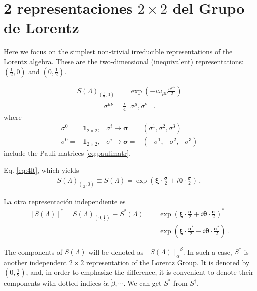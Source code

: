 \section{2 representaciones $2\times 2$ del Grupo de Lorentz}
\begin{frame}
Here we focus on the simplest non-trivial irreducible representations of the Lorentz algebra. These are the two-dimensional (inequivalent) representations: $(\frac{1}{2},0)$ and $(0,\frac{1}{2})$. 

\begin{align}
  S(\Lambda)_{\left( \frac{1}{2},0 \right)}=&\exp\left(-i \omega_{\mu\nu}\frac{\sigma^{\mu\nu}}{2}\right)\nonumber
\end{align}
\begin{align}
  \sigma^{\mu\nu}=\frac{i}{4}\left[\sigma^\mu,\overline{\sigma}^\nu\right]\,.
\end{align}
where
\begin{align}
  \sigma^0=&\mathbf{1}_{2\times2},& \sigma^{i}\to \boldsymbol{\sigma}=&(\sigma^1,\sigma^2,\sigma^3)\nonumber\\
  \overline{\sigma}^0=&\mathbf{1}_{2\times2},& \overline{\sigma}^{i}\to \overline{\boldsymbol{\sigma}}=&(-\sigma^1,-\sigma^2,-\sigma^3)
\end{align}
include the Pauli matrices \eqref{eq:paulimatr}.

\end{frame}
\begin{frame}
Eq. \eqref{eq:4lt}, which yields
\begin{align}
\label{eq:SLet}
  S(\Lambda)_{\left( \frac{1}{2},0 \right)}\equiv S(\Lambda)=
\exp\left( \boldsymbol{\xi}\cdot \frac{\boldsymbol{\sigma}}{2}+i\boldsymbol{\theta}\cdot \frac{\boldsymbol{\sigma}}{2} \right)\,,
\end{align}

La otra representación independiente es
\begin{align}
\label{eq:SLet}
\left[S(\Lambda)\right]^{*} = S(\Lambda)_{\left(0,\frac{1}{2} \right)}\equiv S^{*}(\Lambda)=&
\exp\left( \boldsymbol{\xi}\cdot \frac{\boldsymbol{\sigma}}{2}+i\boldsymbol{\theta}\cdot \frac{\boldsymbol{\sigma}}{2} \right)^{*}\nonumber\\
=&\exp\left( \boldsymbol{\xi}\cdot \frac{\boldsymbol{\sigma}^{*}}{2}-i\boldsymbol{\theta}\cdot \frac{\boldsymbol{\sigma}^{*}}{2} \right)\,.
\end{align}
 
The components of $S(\Lambda)$ will be denoted as ${\left[ S(\Lambda) \right]_{\alpha}}^{\beta}$. In such a case, $S^{*}$ is another independent $2\times2$ representation of the Lorentz Group. It is denoted by $\left( 0,\frac{1}{2}\right)$, and, in order to emphasize the difference, it is convenient to denote their components with dotted indices $\dot{\alpha},\dot{\beta},\cdots$. We can get $S^{*}$ from $S^{\dagger}$.
\end{frame}




